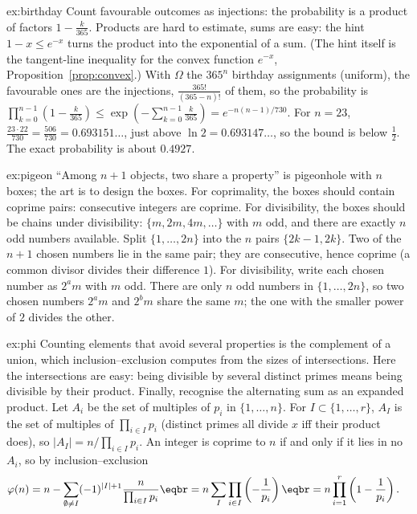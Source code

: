 \begin{solution}{ex:birthday}
\idea Count favourable outcomes as injections: the probability is a product of factors $1-\frac k{365}$. Products are hard to estimate, sums are easy: the hint $1-x\le e^{-x}$ turns the product into the exponential of a sum. (The hint itself is the tangent-line inequality for the convex function $e^{-x}$, Proposition~\ref{prop:convex}.)
\writeup With $\Omega$ the $365^n$ birthday assignments (uniform), the favourable ones are the injections, $\frac{365!}{(365-n)!}$ of them, so the probability is $\prod_{k=0}^{n-1}\left(1-\frac k{365}\right)\le\exp\left(-\sum_{k=0}^{n-1}\frac k{365}\right)=e^{-n(n-1)/730}$.
For $n=23$, $\frac{23\cdot22}{730}=\frac{506}{730}=0.693151\ldots$, just above $\ln2=0.693147\ldots$, so the bound is below $\frac12$.
The exact probability is about $0.4927$.
\end{solution}

\begin{solution}{ex:pigeon}
\idea ``Among $n+1$ objects, two share a property'' is pigeonhole with $n$ boxes; the art is to design the boxes. For coprimality, the boxes should contain coprime pairs: consecutive integers are coprime. For divisibility, the boxes should be chains under divisibility: $\{m,2m,4m,\dots\}$ with $m$ odd, and there are exactly $n$ odd numbers available.
\writeup Split $\{1,\dots,2n\}$ into the $n$ pairs $\{2k-1,2k\}$. Two of the $n+1$ chosen numbers lie in the same pair; they are consecutive, hence coprime (a common divisor divides their difference $1$).
For divisibility, write each chosen number as $2^am$ with $m$ odd. There are only $n$ odd numbers in $\{1,\dots,2n\}$, so two chosen numbers $2^am$ and $2^bm$ share the same $m$;
the one with the smaller power of $2$ divides the other.
\end{solution}

\begin{solution}{ex:phi}
\idea Counting elements that avoid several properties is the complement of a union, which inclusion--exclusion computes from the sizes of intersections. Here the intersections are easy: being divisible by several distinct primes means being divisible by their product. Finally, recognise the alternating sum as an expanded product.
\writeup Let $A_i$ be the set of multiples of $p_i$ in $\{1,\dots,n\}$. For $I\subset\{1,\dots,r\}$, $A_I$ is the set of multiples of $\prod_{i\in I}p_i$ (distinct primes all divide $x$ iff their product does), so $|A_I|=n/\prod_{i\in I}p_i$.
An integer is coprime to $n$ if and only if it lies in no $A_i$, so by inclusion--exclusion
\[
\begin{aligned}\varphi(n)&=n-\sum_{\emptyset\ne I}(-1)^{|I|+1}\frac n{\prod_{i\in I}p_i}\eqbr=n\sum_{I}\prod_{i\in I}\left(-\frac1{p_i}\right)\eqbr=n\prod_{i=1}^r\left(1-\frac1{p_i}\right).\end{aligned}
\]
\end{solution}

